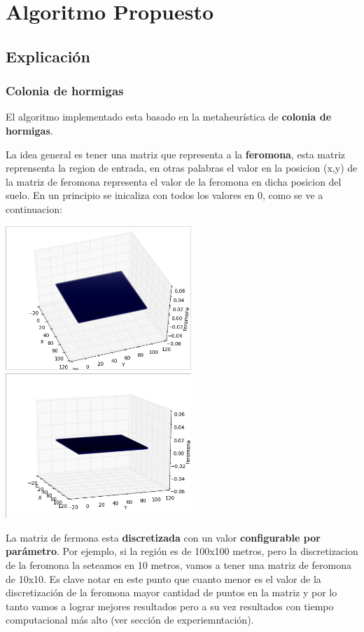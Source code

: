 \newpage
\section{Algoritmo Propuesto}\label{sec:algoritmo}
\subsection{Explicaci\'on}

\subsubsection{Colonia de hormigas}

El algoritmo implementado esta basado en la metaheur\'istica de \textbf{colonia de hormigas}.

La idea general es tener una matriz que representa a la \textbf{feromona}, esta matriz reprensenta la region de entrada, en otras palabras el valor en la posicion (x,y) de la matriz de feromona representa el valor de la feromona en dicha posicion del suelo. En un principio se inicaliza con todos los valores en 0, como se ve a continuacion:


\begin{center}
\includegraphics[width=7cm]{imagenes/feromona0}
\includegraphics[width=7cm]{imagenes/feromona01}
\end{center}

La matriz de fermona esta \textbf{discretizada} con un valor \textbf{configurable por par\'ametro}. Por ejemplo, si la regi\'on es de 100x100 metros, pero la discretizacion de la feromona la seteamos en 10 metros, vamos a tener una matriz de feromona de 10x10. Es clave notar en este punto que cuanto menor es el valor de la discretizaci\'on de la feromona mayor cantidad de puntos en la matriz y por lo tanto vamos a lograr mejores resultados pero a su vez resultados con tiempo computacional m\'as alto (ver secci\'on de experiemntaci\'on).

